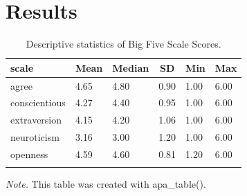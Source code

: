 \documentclass[
  english,
  man]{apa6}
\begin{document}
\hypertarget{results}{%
\section{Results}\label{results}}

\begin{table}[tbp]

\begin{center}
\begin{threeparttable}

\caption{\label{tab:descrips-tab}Descriptive statistics of Big Five Scale Scores.}

\begin{tabular}{llllll}
\toprule
scale & \multicolumn{1}{c}{Mean} & \multicolumn{1}{c}{Median} & \multicolumn{1}{c}{SD} & \multicolumn{1}{c}{Min} & \multicolumn{1}{c}{Max}\\
\midrule
agree & 4.65 & 4.80 & 0.90 & 1.00 & 6.00\\
conscientious & 4.27 & 4.40 & 0.95 & 1.00 & 6.00\\
extraversion & 4.15 & 4.20 & 1.06 & 1.00 & 6.00\\
neuroticism & 3.16 & 3.00 & 1.20 & 1.00 & 6.00\\
openness & 4.59 & 4.60 & 0.81 & 1.20 & 6.00\\
\bottomrule
\addlinespace
\end{tabular}

\begin{tablenotes}[para]
\normalsize{\textit{Note.} This table was created with apa\_table().}
\end{tablenotes}

\end{threeparttable}
\end{center}

\end{table}
\end{document}
